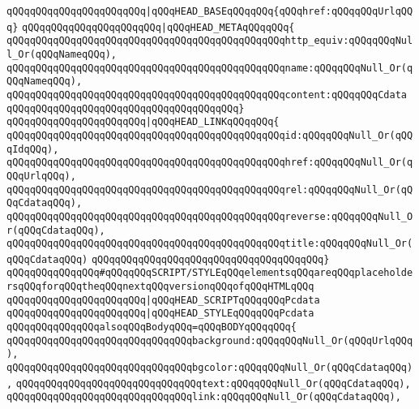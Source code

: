 \verb|qQQqqQQqqQQqqQQqqQQqqQQq|\verb#|qQQqHEAD_BASEqQQqqQQq{qQQqhref:qQQqqQQqUrlqQQq}#\newline
\verb|qQQqqQQqqQQqqQQqqQQqqQQq|\verb#|qQQqHEAD_METAqQQqqQQq{#\newline
\verb|qQQqqQQqqQQqqQQqqQQqqQQqqQQqqQQqqQQqqQQqqQQqqQQqhttp_equiv:qQQqqQQqNull_Or(qQQqNameqQQq),|\newline
\verb|qQQqqQQqqQQqqQQqqQQqqQQqqQQqqQQqqQQqqQQqqQQqqQQqname:qQQqqQQqNull_Or(qQQqNameqQQq),|\newline
\verb|qQQqqQQqqQQqqQQqqQQqqQQqqQQqqQQqqQQqqQQqqQQqqQQqcontent:qQQqqQQqCdata|\newline
\verb|qQQqqQQqqQQqqQQqqQQqqQQqqQQqqQQqqQQqqQQq}|\newline
\verb|qQQqqQQqqQQqqQQqqQQqqQQq|\verb#|qQQqHEAD_LINKqQQqqQQq{#\newline
\verb|qQQqqQQqqQQqqQQqqQQqqQQqqQQqqQQqqQQqqQQqqQQqqQQqid:qQQqqQQqNull_Or(qQQqIdqQQq),|\newline
\verb|qQQqqQQqqQQqqQQqqQQqqQQqqQQqqQQqqQQqqQQqqQQqqQQqhref:qQQqqQQqNull_Or(qQQqUrlqQQq),|\newline
\verb|qQQqqQQqqQQqqQQqqQQqqQQqqQQqqQQqqQQqqQQqqQQqqQQqrel:qQQqqQQqNull_Or(qQQqCdataqQQq),|\newline
\verb|qQQqqQQqqQQqqQQqqQQqqQQqqQQqqQQqqQQqqQQqqQQqqQQqreverse:qQQqqQQqNull_Or(qQQqCdataqQQq),|\newline
\verb|qQQqqQQqqQQqqQQqqQQqqQQqqQQqqQQqqQQqqQQqqQQqqQQqtitle:qQQqqQQqNull_Or(qQQqCdataqQQq)|\newline
\verb|qQQqqQQqqQQqqQQqqQQqqQQqqQQqqQQqqQQqqQQq}|\newline
\verb|qQQqqQQqqQQqqQQq#qQQqqQQqSCRIPT/STYLEqQQqelementsqQQqareqQQqplaceholdersqQQqforqQQqtheqQQqnextqQQqversionqQQqofqQQqHTMLqQQq|\newline
\verb|qQQqqQQqqQQqqQQqqQQqqQQq|\verb#|qQQqHEAD_SCRIPTqQQqqQQqPcdata#\newline
\verb|qQQqqQQqqQQqqQQqqQQqqQQq|\verb#|qQQqHEAD_STYLEqQQqqQQqPcdata#\newline
\newline
\verb|qQQqqQQqqQQqqQQqalsoqQQqBodyqQQq=qQQqBODYqQQqqQQq{|\newline
\verb|qQQqqQQqqQQqqQQqqQQqqQQqqQQqqQQqbackground:qQQqqQQqNull_Or(qQQqUrlqQQq),|\newline
\verb|qQQqqQQqqQQqqQQqqQQqqQQqqQQqqQQqbgcolor:qQQqqQQqNull_Or(qQQqCdataqQQq),|\newline
\verb|qQQqqQQqqQQqqQQqqQQqqQQqqQQqqQQqtext:qQQqqQQqNull_Or(qQQqCdataqQQq),|\newline
\verb|qQQqqQQqqQQqqQQqqQQqqQQqqQQqqQQqlink:qQQqqQQqNull_Or(qQQqCdataqQQq),|\newline
